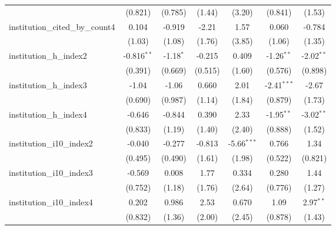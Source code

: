 \begin{tabular}{lcccccc}
                                         & (0.821)       & (0.785)      & (1.44)       & (3.20)        & (0.841)       & (1.53)\\   
   institution\_cited\_by\_count4        & 0.104         & -0.919       & -2.21        & 1.57          & 0.060         & -0.784\\   
                                         & (1.03)        & (1.08)       & (1.76)       & (3.85)        & (1.06)        & (1.35)\\   
   institution\_h\_index2                & -0.816$^{**}$ & -1.18$^{*}$  & -0.215       & 0.409         & -1.26$^{**}$  & -2.02$^{**}$\\   
                                         & (0.391)       & (0.669)      & (0.515)      & (1.60)        & (0.576)       & (0.898)\\   
   institution\_h\_index3                & -1.04         & -1.06        & 0.660        & 2.01          & -2.41$^{***}$ & -2.67\\   
                                         & (0.690)       & (0.987)      & (1.14)       & (1.84)        & (0.879)       & (1.73)\\   
   institution\_h\_index4                & -0.646        & -0.844       & 0.390        & 2.33          & -1.95$^{**}$  & -3.02$^{**}$\\   
                                         & (0.833)       & (1.19)       & (1.40)       & (2.40)        & (0.888)       & (1.52)\\   
   institution\_i10\_index2              & -0.040        & -0.277       & -0.813       & -5.66$^{***}$ & 0.766         & 1.34\\   
                                         & (0.495)       & (0.490)      & (1.61)       & (1.98)        & (0.522)       & (0.821)\\   
   institution\_i10\_index3              & -0.569        & 0.008        & 1.77         & 0.334         & 0.280         & 1.44\\   
                                         & (0.752)       & (1.18)       & (1.76)       & (2.64)        & (0.776)       & (1.27)\\   
   institution\_i10\_index4              & 0.202         & 0.986        & 2.53         & 0.670         & 1.09          & 2.97$^{**}$\\   
                                         & (0.832)       & (1.36)       & (2.00)       & (2.45)        & (0.878)       & (1.43)\\   

\end{tabular}
